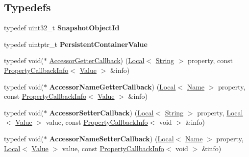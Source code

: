 \subsection*{Typedefs}
\begin{DoxyCompactItemize}
\item 
\hypertarget{namespacev8_acc05be0fdcf26b26fbb410e75a048e63}{}typedef uint32\+\_\+t {\bfseries Snapshot\+Object\+Id}\label{namespacev8_acc05be0fdcf26b26fbb410e75a048e63}

\item 
\hypertarget{namespacev8_af40bc0395e06dd22c3bb1328deb94869}{}typedef uintptr\+\_\+t {\bfseries Persistent\+Container\+Value}\label{namespacev8_af40bc0395e06dd22c3bb1328deb94869}

\item 
typedef void($\ast$ \hyperlink{namespacev8_a722613c87061708a4f1aa050d095f868}{Accessor\+Getter\+Callback}) (\hyperlink{classv8_1_1Local}{Local}$<$ \hyperlink{classv8_1_1String}{String} $>$ property, const \hyperlink{classv8_1_1PropertyCallbackInfo}{Property\+Callback\+Info}$<$ \hyperlink{classv8_1_1Value}{Value} $>$ \&info)
\item 
\hypertarget{namespacev8_a933dad4c36666875af1843bb98df8379}{}typedef void($\ast$ {\bfseries Accessor\+Name\+Getter\+Callback}) (\hyperlink{classv8_1_1Local}{Local}$<$ \hyperlink{classv8_1_1Name}{Name} $>$ property, const \hyperlink{classv8_1_1PropertyCallbackInfo}{Property\+Callback\+Info}$<$ \hyperlink{classv8_1_1Value}{Value} $>$ \&info)\label{namespacev8_a933dad4c36666875af1843bb98df8379}

\item 
\hypertarget{namespacev8_a926da9728efe528d193a6d36f004777e}{}typedef void($\ast$ {\bfseries Accessor\+Setter\+Callback}) (\hyperlink{classv8_1_1Local}{Local}$<$ \hyperlink{classv8_1_1String}{String} $>$ property, \hyperlink{classv8_1_1Local}{Local}$<$ \hyperlink{classv8_1_1Value}{Value} $>$ value, const \hyperlink{classv8_1_1PropertyCallbackInfo}{Property\+Callback\+Info}$<$ void $>$ \&info)\label{namespacev8_a926da9728efe528d193a6d36f004777e}

\item 
\hypertarget{namespacev8_a476b359c9fc5ad874bcc2a1a21075556}{}typedef void($\ast$ {\bfseries Accessor\+Name\+Setter\+Callback}) (\hyperlink{classv8_1_1Local}{Local}$<$ \hyperlink{classv8_1_1Name}{Name} $>$ property, \hyperlink{classv8_1_1Local}{Local}$<$ \hyperlink{classv8_1_1Value}{Value} $>$ value, const \hyperlink{classv8_1_1PropertyCallbackInfo}{Property\+Callback\+Info}$<$ void $>$ \&info)\label{namespacev8_a476b359c9fc5ad874bcc2a1a21075556}


\end{DoxyCompactItemize}
